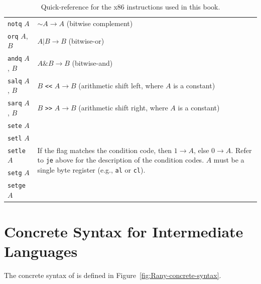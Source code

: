 \documentclass[11pt]{book}
\begin{document}
\begin{table}[tbp]
\begin{tabular}{l|l}
\texttt{notq} $A$ & $\sim A \to A$ \qquad (bitwise complement)\\
\texttt{orq} $A$, $B$ & $A | B \to B$ \qquad (bitwise-or)\\
\texttt{andq} $A$, $B$ & $A \& B \to B$ \qquad (bitwise-and)\\
\texttt{salq} $A$, $B$ & $B$ \texttt{<<} $A \to B$ (arithmetic shift left, where $A$ is a constant)\\
\texttt{sarq} $A$, $B$ & $B$ \texttt{>>} $A \to B$ (arithmetic shift right, where $A$ is a constant)\\
\texttt{sete} $A$ & \multirow{5}{3.7in}{If the flag matches the condition code,
   then $1 \to A$, else $0 \to A$. Refer to \texttt{je} above for the
   description of the condition codes. $A$ must be a single byte register
   (e.g., \texttt{al} or \texttt{cl}).} \\
\texttt{setl} $A$ & \\
\texttt{setle} $A$ & \\
\texttt{setg} $A$ & \\
\texttt{setge} $A$ &
\end{tabular}
\vspace{5pt}
  \caption{Quick-reference for the x86 instructions used in this book.}
  \label{tab:x86-instr}
\end{table}

\cleardoublepage

\section{Concrete Syntax for Intermediate Languages}

The concrete syntax of \LangAny{} is defined in
Figure~\ref{fig:Rany-concrete-syntax}.
\end{document}
